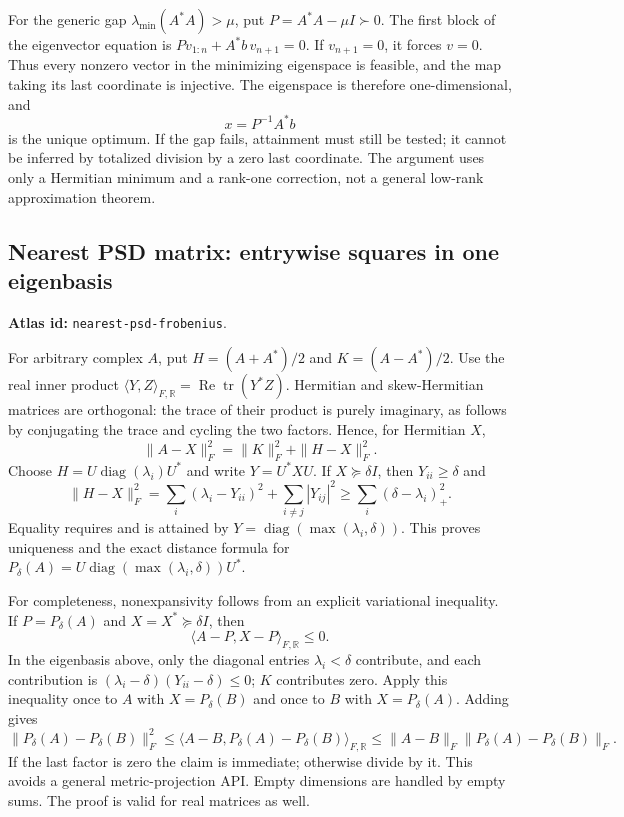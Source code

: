 \documentclass[11pt,a4paper]{article}
\newcommand{\R}{\mathbb R}
\DeclareMathOperator{\tr}{tr}
\DeclareMathOperator{\diag}{diag}
\DeclareRobustCommand{\code}[1]{{\footnotesize\urlstyle{tt}\nolinkurl{#1}}}
\begin{document}
For the generic gap $\lambda_{\min}(A^*A)>\mu$, put
$P=A^*A-\mu I\succ0$. The first block of the eigenvector equation is
$Pv_{1:n}+A^*b\,v_{n+1}=0$. If $v_{n+1}=0$, it forces $v=0$.
Thus every nonzero vector in the minimizing eigenspace is feasible, and
the map taking its last coordinate is injective. The eigenspace is
therefore one-dimensional, and
\[
 x=P^{-1}A^*b
\]
is the unique optimum. If the gap fails, attainment must still be tested;
it cannot be inferred by totalized division by a zero last coordinate.
The argument uses only a Hermitian minimum and a rank-one correction,
not a general low-rank approximation theorem.

\subsection{Nearest PSD matrix: entrywise squares in one eigenbasis}
\label{sec:eq-nearest-psd}
\textbf{Atlas id:} \code{nearest-psd-frobenius}.

For arbitrary complex $A$, put $H=(A+A^*)/2$ and $K=(A-A^*)/2$.
Use the real inner product
$\langle Y,Z\rangle_{F,\R}=\operatorname{Re}\tr(Y^*Z)$.
Hermitian and skew-Hermitian matrices are orthogonal: the trace of their
product is purely imaginary, as follows by conjugating the trace and
cycling the two factors. Hence, for Hermitian $X$,
\[
 \|A-X\|_F^2=\|K\|_F^2+\|H-X\|_F^2.
\]
Choose $H=U\diag(\lambda_i)U^*$ and write $Y=U^*XU$. If
$X\succeq\delta I$, then $Y_{ii}\ge\delta$ and
\[
 \|H-X\|_F^2
 =\sum_i(\lambda_i-Y_{ii})^2+\sum_{i\ne j}|Y_{ij}|^2
 \ge\sum_i(\delta-\lambda_i)_+^2.
\]
Equality requires and is attained by
$Y=\diag(\max(\lambda_i,\delta))$. This proves uniqueness and the
exact distance formula for
$P_\delta(A)=U\diag(\max(\lambda_i,\delta))U^*$.

For completeness, nonexpansivity follows from an explicit variational
inequality. If $P=P_\delta(A)$ and $X=X^*\succeq\delta I$, then
\[
 \langle A-P,X-P\rangle_{F,\R}\le0.
\]
In the eigenbasis above, only the diagonal entries $\lambda_i<\delta$
contribute, and each contribution is
$(\lambda_i-\delta)(Y_{ii}-\delta)\le0$; $K$ contributes zero.
Apply this inequality once to $A$ with $X=P_\delta(B)$ and once to $B$
with $X=P_\delta(A)$. Adding gives
\[
 \|P_\delta(A)-P_\delta(B)\|_F^2
 \le\langle A-B,P_\delta(A)-P_\delta(B)\rangle_{F,\R}
 \le\|A-B\|_F\|P_\delta(A)-P_\delta(B)\|_F.
\]
If the last factor is zero the claim is immediate; otherwise divide by
it. This avoids a general metric-projection API. Empty dimensions are
handled by empty sums. The proof is valid for real matrices as well.
\end{document}
